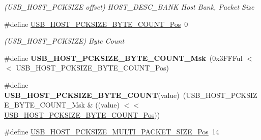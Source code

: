 \begin{DoxyCompactItemize}
\begin{DoxyCompactList}\small\item\em (U\+S\+B\+\_\+\+H\+O\+S\+T\+\_\+\+P\+C\+K\+S\+I\+Z\+E offset) H\+O\+S\+T\+\_\+\+D\+E\+S\+C\+\_\+\+B\+A\+N\+K Host Bank, Packet Size \end{DoxyCompactList}\item 
\hypertarget{group___s_a_m_l21___u_s_b_ga7ee7bcdf5c1d8ef7b805bc7b787d3783}{}\#define \hyperlink{group___s_a_m_l21___u_s_b_ga7ee7bcdf5c1d8ef7b805bc7b787d3783}{U\+S\+B\+\_\+\+H\+O\+S\+T\+\_\+\+P\+C\+K\+S\+I\+Z\+E\+\_\+\+B\+Y\+T\+E\+\_\+\+C\+O\+U\+N\+T\+\_\+\+Pos}~0\label{group___s_a_m_l21___u_s_b_ga7ee7bcdf5c1d8ef7b805bc7b787d3783}

\begin{DoxyCompactList}\small\item\em (U\+S\+B\+\_\+\+H\+O\+S\+T\+\_\+\+P\+C\+K\+S\+I\+Z\+E) Byte Count \end{DoxyCompactList}\item 
\hypertarget{group___s_a_m_l21___u_s_b_ga664ebb97d14e2439959f0e7bd5f69f4e}{}\#define {\bfseries U\+S\+B\+\_\+\+H\+O\+S\+T\+\_\+\+P\+C\+K\+S\+I\+Z\+E\+\_\+\+B\+Y\+T\+E\+\_\+\+C\+O\+U\+N\+T\+\_\+\+Msk}~(0x3\+F\+F\+Ful $<$$<$ U\+S\+B\+\_\+\+H\+O\+S\+T\+\_\+\+P\+C\+K\+S\+I\+Z\+E\+\_\+\+B\+Y\+T\+E\+\_\+\+C\+O\+U\+N\+T\+\_\+\+Pos)\label{group___s_a_m_l21___u_s_b_ga664ebb97d14e2439959f0e7bd5f69f4e}

\item 
\hypertarget{group___s_a_m_l21___u_s_b_gab42f158f61bfbe971f9da02a503f0af7}{}\#define {\bfseries U\+S\+B\+\_\+\+H\+O\+S\+T\+\_\+\+P\+C\+K\+S\+I\+Z\+E\+\_\+\+B\+Y\+T\+E\+\_\+\+C\+O\+U\+N\+T}(value)~(U\+S\+B\+\_\+\+H\+O\+S\+T\+\_\+\+P\+C\+K\+S\+I\+Z\+E\+\_\+\+B\+Y\+T\+E\+\_\+\+C\+O\+U\+N\+T\+\_\+\+Msk \& ((value) $<$$<$ \hyperlink{group___s_a_m_l21___u_s_b_ga7ee7bcdf5c1d8ef7b805bc7b787d3783}{U\+S\+B\+\_\+\+H\+O\+S\+T\+\_\+\+P\+C\+K\+S\+I\+Z\+E\+\_\+\+B\+Y\+T\+E\+\_\+\+C\+O\+U\+N\+T\+\_\+\+Pos}))\label{group___s_a_m_l21___u_s_b_gab42f158f61bfbe971f9da02a503f0af7}

\item 
\hypertarget{group___s_a_m_l21___u_s_b_ga5f8e56dec62e103c573bc4ffa746ca08}{}\#define \hyperlink{group___s_a_m_l21___u_s_b_ga5f8e56dec62e103c573bc4ffa746ca08}{U\+S\+B\+\_\+\+H\+O\+S\+T\+\_\+\+P\+C\+K\+S\+I\+Z\+E\+\_\+\+M\+U\+L\+T\+I\+\_\+\+P\+A\+C\+K\+E\+T\+\_\+\+S\+I\+Z\+E\+\_\+\+Pos}~14\label{group___s_a_m_l21___u_s_b_ga5f8e56dec62e103c573bc4ffa746ca08}


\end{DoxyCompactItemize}
